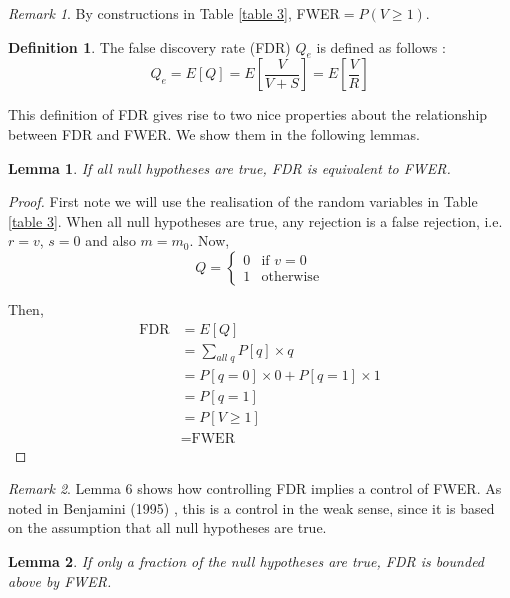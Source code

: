 \documentclass[12pt]{article}
\theoremstyle{plain}
\newtheorem{lemma}{Lemma}
\theoremstyle{definition}
\newtheorem{definition}{Definition}
\theoremstyle{remark}
\newtheorem*{remark}{Remark}
\begin{document}
\begin{remark}
By constructions in Table \ref{table 3}, FWER$=P(V\ge1)$.
\end{remark}

\begin{definition}
The false discovery rate (FDR) $Q_e$ is defined as follows \cite{5.7}:\[
Q_e=E[Q]=E\left[\frac{V}{V+S}\right]=E\left[\frac{V}{R}\right]
\]
\end{definition}

This definition of FDR gives rise to two nice properties about the relationship between FDR and FWER. We show them in the following lemmas.

\begin{lemma}
If all null hypotheses are true, FDR is equivalent to FWER. \cite{5.7}
\end{lemma}

\begin{proof} \cite{5.3}
First note we will use the realisation of the random variables in Table \ref{table 3}. When all null hypotheses are true, any rejection is a false rejection, i.e. $r=v$, $s=0$ and also $m=m_0$. Now, 
\begin{equation*}
  Q=
    \begin{cases}
    0&\text{if $v=0$}\\
    1&\text{otherwise}
    \end{cases}
\end{equation*}

Then,
\begin{align*}
    \text{FDR}&=E[Q]\\
    &=\sum_{all\;q}P[q]\times q\\
    &=P[q=0]\times0+P[q=1]\times1\\
    &=P[q=1]\\
    &=P[V\ge 1]\\
    &=\text{FWER}
\end{align*}
\end{proof}

\begin{remark}
Lemma 6 shows how controlling FDR implies a control of FWER. As noted in Benjamini (1995) \cite{5.7}, this is a control in the weak sense, since it is based on the assumption that all null hypotheses are true.
\end{remark}

\begin{lemma}
If only a fraction of the null hypotheses are true, FDR is bounded above by FWER. \cite{5.7}
\end{lemma}
\end{document}
